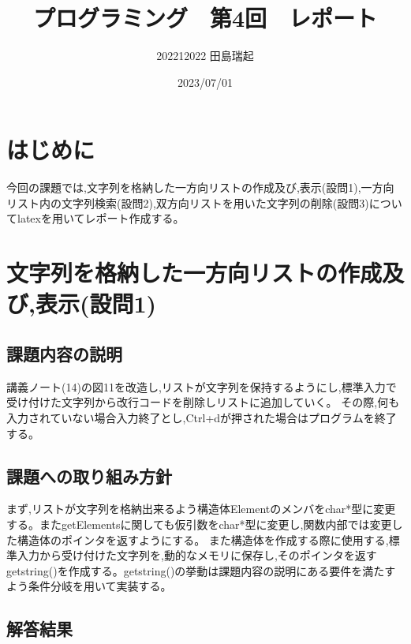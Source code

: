 \documentclass[fontsize = 10pt, paper= a4,twocolumn,column_gap=3zw]{jlreq}
\begin{document}
\title{プログラミング　第4回　レポート}
\author{202212022 田島瑞起}
\date{2023/07/01}
\maketitle

\section{はじめに}
今回の課題では,文字列を格納した一方向リストの作成及び,表示(設問1),一方向リスト内の文字列検索(設問2),双方向リストを用いた文字列の削除(設問3)についてlatexを用いてレポート作成する。
\section{文字列を格納した一方向リストの作成及び,表示(設問1)}
\subsection{課題内容の説明}
講義ノート(14)の図11を改造し,リストが文字列を保持するようにし,標準入力で受け付けた文字列から改行コードを削除しリストに追加していく。
その際,何も入力されていない場合入力終了とし,Ctrl+dが押された場合はプログラムを終了する。
\subsection{課題への取り組み方針}
まず,リストが文字列を格納出来るよう構造体Elementのメンバをchar*型に変更する。またgetElementsに関しても仮引数をchar*型に変更し,関数内部では変更した構造体のポインタを返すようにする。
また構造体を作成する際に使用する,標準入力から受け付けた文字列を,動的なメモリに保存し,そのポインタを返すgetstring()を作成する。getstring()の挙動は課題内容の説明にある要件を満たすよう条件分岐を用いて実装する。
\subsection{解答結果}
\end{document}
